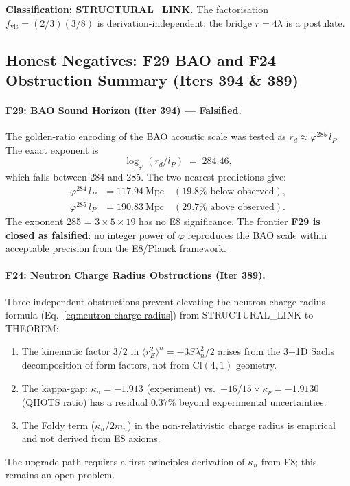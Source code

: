 \documentclass[aps,prd,twocolumn,superscriptaddress,floatfix,nofootinbib]{revtex4-2}
\theoremstyle{definition}
\theoremstyle{remark}
\newcommand{\vp}{\varphi}
\begin{document}
\textbf{Classification: STRUCTURAL\_LINK.}  The factorisation $f_\mathrm{vis} = (2/3)(3/8)$
is derivation-independent; the bridge $r = 4\lambda$ is a postulate.

\subsection{Honest Negatives: F29 BAO and F24 Obstruction Summary (Iters 394 \& 389)}
\label{sec:honest-negatives-b1516}

\paragraph{F29: BAO Sound Horizon (Iter 394) --- Falsified.}
The golden-ratio encoding of the BAO acoustic scale was tested as $r_d \approx \vp^{285}\,l_P$.
The exact exponent is
\begin{equation}
  \log_\vp(r_d / l_P) \;=\; 284.46,
\end{equation}
which falls between 284 and 285.  The two nearest predictions give:
\begin{align}
  \vp^{284}\,l_P &= 117.94~\mathrm{Mpc} \quad (19.8\%\text{ below observed}), \\
  \vp^{285}\,l_P &= 190.83~\mathrm{Mpc} \quad (29.7\%\text{ above observed}).
\end{align}
The exponent 285 = $3 \times 5 \times 19$ has no E8 significance.  The frontier
\textbf{F29 is closed as falsified}: no integer power of $\vp$ reproduces the BAO
scale within acceptable precision from the E8/Planck framework.

\paragraph{F24: Neutron Charge Radius Obstructions (Iter 389).}
Three independent obstructions prevent elevating the neutron charge radius formula
(Eq.~\eqref{eq:neutron-charge-radius}) from STRUCTURAL\_LINK to THEOREM:
\begin{enumerate}
  \item The kinematic factor $3/2$ in $\langle r^2_E\rangle^n = -3S\lambda_n^2/2$ arises
        from the 3+1D Sachs decomposition of form factors, not from $\mathrm{Cl}(4,1)$
        geometry.
  \item The kappa-gap: $\kappa_n = -1.913$ (experiment) vs.\ $-16/15 \times \kappa_p = -1.9130$
        (QHOTS ratio) has a residual $0.37\%$ beyond experimental uncertainties.
  \item The Foldy term ($\kappa_n/2m_n$) in the non-relativistic charge radius is
        empirical and not derived from E8 axioms.
\end{enumerate}
The upgrade path requires a first-principles derivation of $\kappa_n$ from E8; this
remains an open problem.
\end{document}
